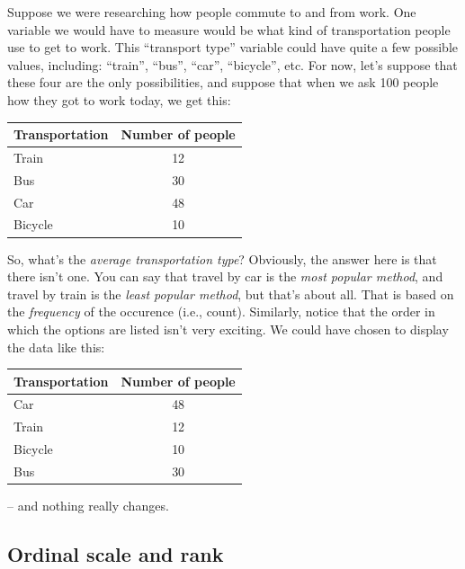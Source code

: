 \documentclass[
  11pt,
  a4paper,
  twoside,symmetric,openright]{book}
\theoremstyle{break}
\theoremstyle{break}
\begin{document}
\begin{example}
\protect\hypertarget{exm:exnominal}{}\label{exm:exnominal}Suppose we were researching how people commute to and from work. One variable we would have to measure would be what kind of transportation people use to get to work. This ``transport type'' variable could have quite a few possible values, including: ``train'', ``bus'', ``car'', ``bicycle'', etc. For now, let's suppose that these four are the only possibilities, and suppose that when we ask 100 people how they got to work today, we get this:

\begin{table}[H]
\centering
\begin{tabular}{lc}
\toprule
Transportation & Number of people\\
\midrule
Train & 12\\
Bus & 30\\
Car & 48\\
Bicycle & 10\\
\bottomrule
\end{tabular}
\end{table}

So, what's the \emph{average transportation type}? Obviously, the answer here is that there isn't one. You can say that travel by car is the \emph{most popular method}, and travel by train is the \emph{least popular method}, but that's about all. That is based on the \emph{frequency} of the occurence (i.e., count). Similarly, notice that the order in which the options are listed isn't very exciting. We could have chosen to display the data like this:

\begin{table}[H]
\centering
\begin{tabular}{lc}
\toprule
Transportation & Number of people\\
\midrule
Car & 48\\
Train & 12\\
Bicycle & 10\\
Bus & 30\\
\bottomrule
\end{tabular}
\end{table}

-- and nothing really changes.
\end{example}

\subsection{Ordinal scale and rank}\label{ordinalscale}
\end{document}
